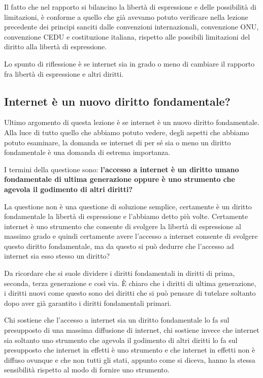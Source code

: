 Il fatto che nel rapporto si bilancino la libertà di espressione e delle possibilità di limitazioni, è conforme a quello che già avevamo potuto verificare nella lezione precedente dei principi sanciti dalle convenzioni internazionali, convenzione ONU, convenzione CEDU e costituzione italiana, rispetto alle possibili limitazioni del diritto alla libertà di espressione.

Lo spunto di riflessione è se internet sia in grado o meno di cambiare il rapporto fra libertà di espressione e altri diritti.

\subsection{Internet è un nuovo diritto fondamentale?}

Ultimo argomento di questa lezione è se internet è un nuovo diritto fondamentale. Alla luce di tutto quello che abbiamo potuto vedere, degli aspetti che abbiamo potuto esaminare, la domanda se internet di per sé sia o meno un diritto fondamentale è una domanda di estrema importanza.

I termini della questione sono: \textbf{l'accesso a internet è un diritto umano fondamentale di ultima generazione oppure è uno strumento che agevola il godimento di altri diritti?}

La questione non è una questione di soluzione semplice, certamente è un diritto fondamentale la libertà di espressione e l'abbiamo detto più volte. Certamente internet è uno strumento che consente di svolgere la libertà di espressione al massimo grado e quindi certamente avere l'accesso a internet consente di svolgere questo diritto fondamentale, ma da questo si può dedurre che l'accesso ad internet sia esso stesso un diritto?

Da ricordare che si suole dividere i diritti fondamentali in diritti di prima, seconda, terza generazione e così via. È chiaro che i diritti di ultima generazione, i diritti nuovi come questo sono dei diritti che si può pensare di tutelare soltanto dopo aver già garantito i diritti fondamentali primari.

Chi sostiene che l'accesso a internet sia un diritto fondamentale lo fa sul presupposto di una massima diffusione di internet, chi sostiene invece che internet sia soltanto uno strumento che agevola il godimento di altri diritti lo fa sul presupposto che internet in effetti è uno strumento e che internet in effetti non è diffuso ovunque e che non tutti gli stati, appunto come si diceva, hanno la stessa sensibilità rispetto al modo di fornire uno strumento.

